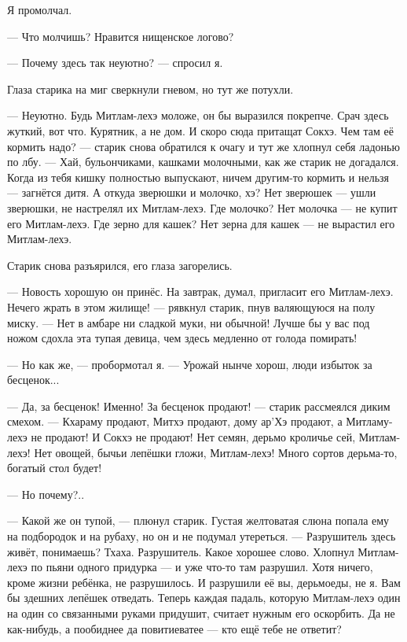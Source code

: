 Я промолчал.

--- Что молчишь?
Нравится нищенское логово?

--- Почему здесь так неуютно? --- спросил я.

Глаза старика на миг сверкнули гневом, но тут же потухли.

--- Неуютно.
Будь Митлам-лехэ моложе, он бы выразился покрепче.
Срач здесь жуткий, вот что.
Курятник, а не дом.
И скоро сюда притащат Сокхэ.
Чем там её кормить надо? --- старик снова обратился к очагу и тут же хлопнул себя ладонью по лбу.
--- Хай, бульончиками, кашками молочными, как же старик не догадался.
Когда из тебя кишку полностью выпускают, ничем другим-то кормить и нельзя --- загнётся дитя.
А откуда зверюшки и молочко, хэ?
Нет зверюшек --- ушли зверюшки, не настрелял их Митлам-лехэ.
Где молочко?
Нет молочка --- не купит его Митлам-лехэ.
Где зерно для кашек?
Нет зерна для кашек --- не вырастил его Митлам-лехэ.

Старик снова разъярился, его глаза загорелись.

--- Новость хорошую он принёс.
На завтрак, думал, пригласит его Митлам-лехэ.
Нечего жрать в этом жилище! --- рявкнул старик, пнув валяющуюся на полу миску.
--- Нет в амбаре ни сладкой муки, ни обычной!
Лучше бы у вас под ножом сдохла эта тупая девица, чем здесь медленно от голода помирать!

--- Но как же, --- пробормотал я.
--- Урожай нынче хорош, люди избыток за бесценок...

--- Да, за бесценок!
Именно!
За бесценок продают! --- старик рассмеялся диким смехом.
--- Кхараму продают, Митхэ продают, дому ар’Хэ продают, а Митламу-лехэ не продают!
И Сокхэ не продают!
Нет семян, дерьмо кроличье сей, Митлам-лехэ!
Нет овощей, бычьи лепёшки гложи, Митлам-лехэ!
Много сортов дерьма-то, богатый стол будет!

--- Но почему?..

--- Какой же он тупой, --- плюнул старик.
Густая желтоватая слюна попала ему на подбородок и на рубаху, но он и не подумал утереться.
--- Разрушитель здесь живёт, понимаешь?
Тхаха.
Разрушитель.
Какое хорошее слово.
Хлопнул Митлам-лехэ по пьяни одного придурка --- и уже что-то там разрушил.
Хотя ничего, кроме жизни ребёнка, не разрушилось.
И разрушили её вы, дерьмоеды, не я.
Вам бы здешних лепёшек отведать.
Теперь каждая падаль, которую Митлам-лехэ один на один со связанными руками придушит, считает нужным его оскорбить.
Да не как-нибудь, а пообиднее да повитиеватее --- кто ещё тебе не ответит?

